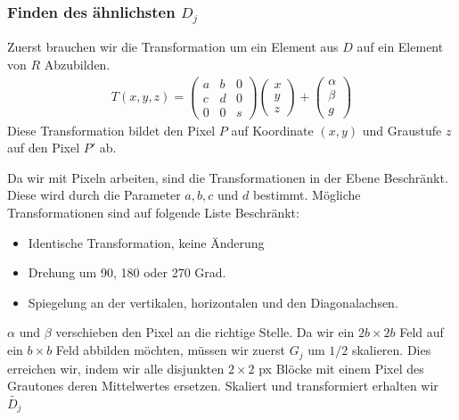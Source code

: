 \subsubsection{Finden des ähnlichsten $D_j$}
Zuerst brauchen wir die Transformation um ein Element aus $D$ auf ein Element von $R$ Abzubilden.
\begin{align*}
	T(x,y,z) = 
	\begin{pmatrix}
		a & b & 0 \\
		c & d & 0 \\
		0 & 0 & s
	\end{pmatrix}
	\begin{pmatrix}
		x \\
		y \\
		z
	\end{pmatrix}
	+
	\begin{pmatrix}
		\alpha \\
		\beta \\
		g
	\end{pmatrix}
\end{align*}
Diese Transformation bildet den Pixel $P$ auf Koordinate $(x,y)$ und Graustufe $z$ auf den Pixel $P'$ ab.

Da wir mit Pixeln arbeiten, sind die Transformationen in der Ebene Beschränkt.
Diese wird durch die Parameter $a,b,c$ und $d$ bestimmt.
Mögliche Transformationen sind auf folgende Liste Beschränkt:
\begin{itemize}
	\item Identische Transformation, keine Änderung
	\item Drehung um 90, 180 oder 270 Grad.
	\item Spiegelung an der vertikalen, horizontalen und den Diagonalachsen.
\end{itemize}
$\alpha$ und $\beta$ verschieben den Pixel an die richtige Stelle.
Da wir ein $2b \times 2b$ Feld auf ein $b \times b$ Feld abbilden möchten, müssen wir zuerst $G_j$ um $1/2$ skalieren.
Dies erreichen wir, indem wir alle disjunkten $2 \times 2$ px Blöcke mit einem Pixel des Grautones deren Mittelwertes ersetzen.
Skaliert und transformiert erhalten wir $\tilde{D_j}$


